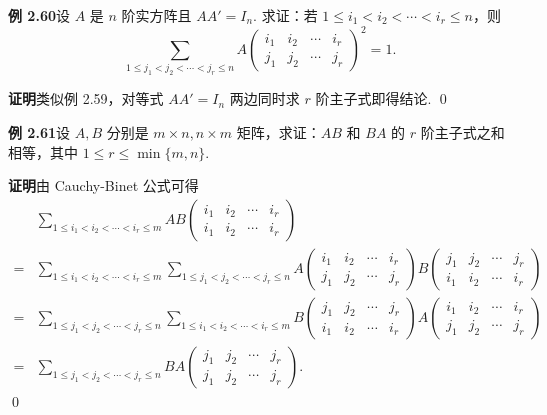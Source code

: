 \documentclass[UTF8, 12pt, fontset=fandol, oneside]{ctexart}
\begin{document}
\noindent\textbf{例 2.60}\quad 设 $A$ 是 $n$ 阶实方阵且 $AA'=I_n$. 求证：若 $1\le i_1<i_2<\cdots<i_r\le n$，则
\[
\sum_{1\le j_1<j_2<\cdots<j_r\le n}
A\left(
\begin{array}{cccc}
i_1 & i_2 & \cdots & i_r\\
j_1 & j_2 & \cdots & j_r
\end{array}
\right)^2=1.
\]

\noindent\textbf{证明}\quad 类似例 2.59，对等式 $AA'=I_n$ 两边同时求 $r$ 阶主子式即得结论. \qed

\noindent\textbf{例 2.61}\quad 设 $A,B$ 分别是 $m\times n,n\times m$ 矩阵，求证：$AB$ 和 $BA$ 的 $r$ 阶主子式之和相等，其中 $1\le r\le\min\{m,n\}$.

\noindent\textbf{证明}\quad 由 Cauchy-Binet 公式可得
\[
\begin{aligned}
&\sum_{1\le i_1<i_2<\cdots<i_r\le m}
AB\left(
\begin{array}{cccc}
i_1 & i_2 & \cdots & i_r\\
i_1 & i_2 & \cdots & i_r
\end{array}
\right)\\
={}&
\sum_{1\le i_1<i_2<\cdots<i_r\le m}
\sum_{1\le j_1<j_2<\cdots<j_r\le n}
A\left(
\begin{array}{cccc}
i_1 & i_2 & \cdots & i_r\\
j_1 & j_2 & \cdots & j_r
\end{array}
\right)
B\left(
\begin{array}{cccc}
j_1 & j_2 & \cdots & j_r\\
i_1 & i_2 & \cdots & i_r
\end{array}
\right)\\
={}&
\sum_{1\le j_1<j_2<\cdots<j_r\le n}
\sum_{1\le i_1<i_2<\cdots<i_r\le m}
B\left(
\begin{array}{cccc}
j_1 & j_2 & \cdots & j_r\\
i_1 & i_2 & \cdots & i_r
\end{array}
\right)
A\left(
\begin{array}{cccc}
i_1 & i_2 & \cdots & i_r\\
j_1 & j_2 & \cdots & j_r
\end{array}
\right)\\
={}&
\sum_{1\le j_1<j_2<\cdots<j_r\le n}
BA\left(
\begin{array}{cccc}
j_1 & j_2 & \cdots & j_r\\
j_1 & j_2 & \cdots & j_r
\end{array}
\right).
\end{aligned}
\]
\qed
\end{document}
